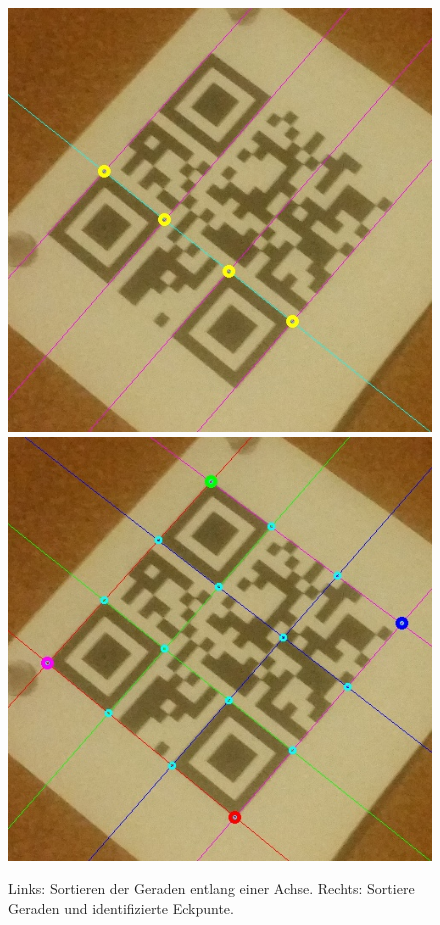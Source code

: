\begin{figure}[h]
\center
\includegraphics[scale=0.25]{images/qrcode-adler-wand_7___SORT___0_.jpg}
\hspace{5px}
\includegraphics[scale=0.25]{images/qrcode-adler-wand_9___INTERSECTIONS___0_.jpg}
\caption{Links: Sortieren der Geraden entlang einer Achse.\label{fig:sort} Rechts: Sortiere Geraden und identifizierte Eckpunte.\label{fig:lines}}
\end{figure}

